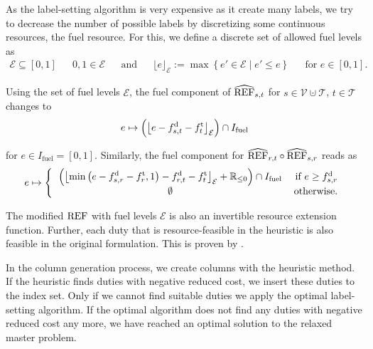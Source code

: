 As the label-setting algorithm is very expensive as it create many labels, we try to decrease the number of possible labels by discretizing some continuous resources, \eg the fuel resource. For this, we define a discrete set of allowed fuel levels as
\begin{align*}
	\mathcal{E}\subseteq[0,1] && 0,1\in\mathcal{E} && \text{and} && \lfloor e\rfloor_{\mathcal{E}} := \max\left\{e'\in\mathcal{E}\mid e'\leq e\right\} && \text{for } e\in[0,1].
\end{align*}

Using the set of fuel levels $\mathcal{E}$, the fuel component of $\widehat{\operatorname{REF}}_{s,t}$ for ${s\in\mathcal{V}\cupdot\mathcal{T}}$, ${t\in\mathcal{T}}$ changes to
\begin{align*}
	e\mapsto \left(\left\lfloor e - f^{\operatorname{d}}_{s,t} - f^{\operatorname{t}}_t\right\rfloor_{\mathcal{E}}\right)\cap I_{\operatorname{fuel}}
\end{align*}

for $e\in I_{\operatorname{fuel}} = [0,1]$. Similarly, the fuel component for ${\widehat{\operatorname{REF}}_{r,t}\circ\widehat{\operatorname{REF}}_{s,r}}$ reads as
\begin{align*}
	e\mapsto \left\{\begin{tabular}{cr}
		$\displaystyle{\left(\left\lfloor\min\left(e - \fd_{s,r} - \ft_r, 1\right) - \fd_{r,t} - \ft_t\right\rfloor_{\mathcal{E}} + \mathbb{R}_{\leq 0}\right)\cap I_{\operatorname{fuel}}}$ & if $e\geq \fd_{s,r}$ \\
		$\emptyset$ & otherwise.
	\end{tabular}\right.
\end{align*}

The modified $\operatorname{REF}$ with fuel levels $\mathcal{E}$ is also an invertible resource extension function. Further, each duty that is resource-feasible in the heuristic is also feasible in the original formulation. This is proven by \cite{Kaiser}.

In the column generation process, we create columns with the heuristic method. If the heuristic finds duties with negative reduced cost, we insert these duties to the index set. Only if we cannot find suitable duties we apply the optimal label-setting algorithm. If the optimal algorithm does not find any duties with negative reduced cost any more, we have reached an optimal solution to the relaxed master problem.



